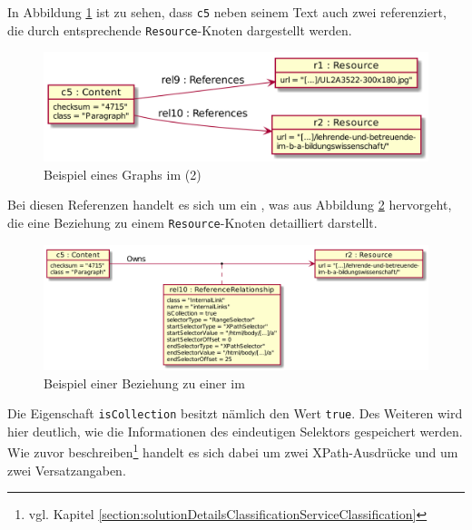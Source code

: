     In Abbildung \ref{image:dbDataModelExampleOverviewPart2} ist zu sehen,
    dass \texttt{c5} neben seinem Text auch zwei {\resources} referenziert,
    die durch entsprechende \texttt{Resource}-Knoten dargestellt werden.

    \begin{figure}[htb]
        \centering
        \includegraphics[scale=\imageScalingFactor]{../resources/db-data-model/example/example_part2.png}
        \caption{Beispiel eines Graphs im {\classificationStorage} (2)}
        \label{image:dbDataModelExampleOverviewPart2}
    \end{figure}

    Bei diesen Referenzen handelt es sich um ein {\collectionFeature},
    was aus Abbildung \ref{image:dbDataModelExampleRel10} hervorgeht,
    die eine Beziehung zu einem \texttt{Resource}-Knoten detailliert darstellt.

    \begin{figure}[htb]
        \centering
        \includegraphics[scale=\imageScalingFactor]{../resources/db-data-model/example/c5-r2.png}
        \caption{Beispiel einer Beziehung zu einer {\resource} im {\classificationStorage}}
        \label{image:dbDataModelExampleRel10}
    \end{figure}

    Die Eigenschaft \texttt{isCollection} besitzt nämlich den Wert \texttt{true}.
    Des Weiteren wird hier deutlich, wie die Informationen des eindeutigen Selektors gespeichert werden.
    Wie zuvor beschreiben\footnote{vgl. Kapitel \ref{section:solutionDetailsClassificationServiceClassification}}
    handelt es sich dabei um zwei XPath-Ausdrücke und um zwei Versatzangaben.

